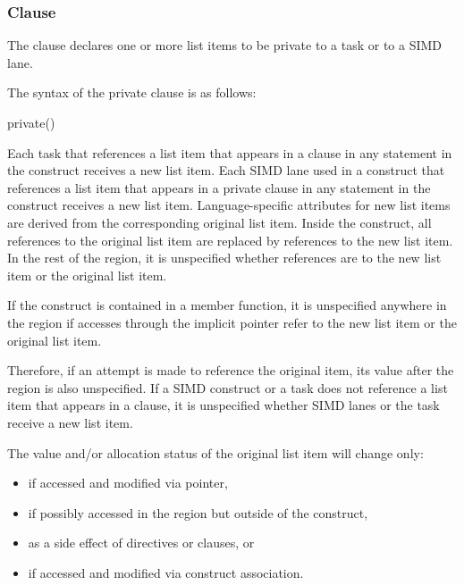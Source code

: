 \subsubsection{ Clause}
\label{subsubsec:private clause}
\summary
The  clause declares one or more list items to be private to a task or to a 
SIMD lane.

\syntax
The syntax of the private clause is as follows:

\begin{boxedcode}
private()
\end{boxedcode}

\descr
Each task that references a list item that appears in a  clause in any statement 
in the construct receives a new list item. Each SIMD lane used in a  construct that 
references a list item that appears in a private clause in any statement in the construct 
receives a new list item. Language-specific attributes for new list items are derived from 
the corresponding original list item. Inside the construct, all references to the original 
list item are replaced by references to the new list item. In the rest of the region, it is 
unspecified whether references are to the new list item or the original list item. 

\cppspecificstart
If the construct is contained in a member function, it is unspecified anywhere in the region if accesses through the implicit  pointer refer to the new list item or the original list item.
\cppspecificend

Therefore, if an attempt is made to reference the original item, its value after the region 
is also unspecified. If a SIMD construct or a task does not reference a list item that 
appears in a  clause, it is unspecified whether SIMD lanes or the task receive 
a new list item. 

The value and/or allocation status of the original list item will change only: 

\begin{itemize}
\item if accessed and modified via pointer, 

\item if possibly accessed in the region but outside of the construct, 

\item as a side effect of directives or clauses, or

\fortranspecificstart
\item if accessed and modified via construct association.
\fortranspecificend
\end{itemize}

